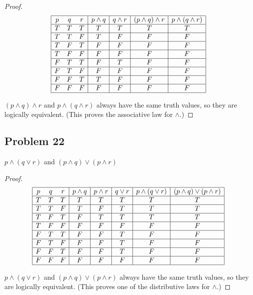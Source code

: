 \documentclass[14pt]{extarticle}
\begin{document}
\begin{proof}
$$
\begin{array}{|ccc|c|c|c|c|}
\hline
p & q & r & p \wedge q & q \wedge r & (p \wedge q) \wedge r &
p \wedge (q \wedge r) \\
\hline
T & T & T & T & T & T & T \\
\hline
T & T & F & T & F & F & F \\
\hline
T & F & T & F & F & F & F \\
\hline
T & F & F & F & F & F & F \\
\hline
F & T & T & F & T & F & F \\
\hline
F & T & F & F & F & F & F \\
\hline
F & F & T & T & F & F & F \\
\hline
F & F & F & F & F & F & F \\
\hline
\end{array}
$$

$(p \wedge q) \wedge r$ and $p \wedge (q \wedge r)$ always have the same truth
values, so they are logically equivalent. (This proves the associative law for
$\wedge$.)
\end{proof}

\subsection{Problem 22}
$p \wedge (q \vee r)$ and $(p \wedge q) \vee (p \wedge r)$

\begin{proof}
$$
\begin{array}{|ccc|c|c|c|c|c|}
\hline
p & q & r & p \wedge q & p \wedge r & q \vee r & p \wedge (q \vee r) &
(p \wedge q) \vee (p \wedge r) \\
\hline
T & T & T & T & T & T & T & T \\
\hline
T & T & F & T & F & T & T & T \\
\hline
T & F & T & F & T & T & T & T \\
\hline
T & F & F & F & F & F & F & F \\
\hline
F & T & T & F & F & T & F & F \\
\hline
F & T & F & F & F & T & F & F \\
\hline
F & F & T & F & F & T & F & F \\
\hline
F & F & F & F & F & F & F & F \\
\hline
\end{array}
$$

$p \wedge (q \vee r)$ and $(p \wedge q) \vee (p \wedge r)$ always have the same
truth values, so they are logically equivalent. (This proves one of the
distributive laws for $\wedge$.)
\end{proof}
\end{document}
